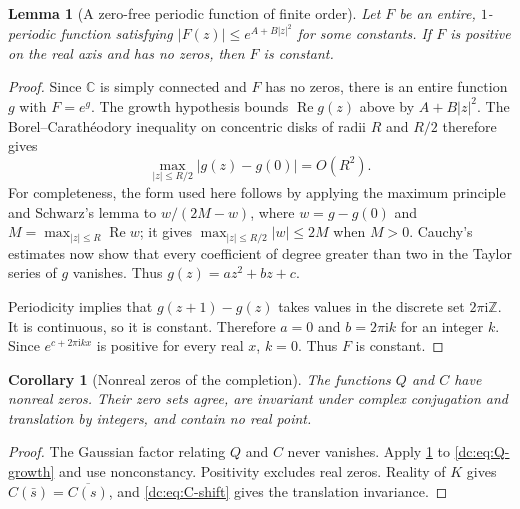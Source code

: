 \documentclass[11pt,a4paper,oneside,openany]{book}
\numberwithin{equation}{chapter}
\newtheorem{lemma}[theorem]{Lemma}
\newtheorem{corollary}[theorem]{Corollary}
\theoremstyle{definition}
\theoremstyle{remark}
\newcommand{\Z}{\mathbb Z}
\newcommand{\C}{\mathbb C}
\newcommand{\ii}{\mathrm i}
\newcommand{\abs}[1]{\left\lvert #1\right\rvert}
\DeclareMathOperator{\Rea}{Re}
\begin{document}
\begin{lemma}[A zero-free periodic function of finite order]
\label{dc:lem:periodic-zero}
Let $F$ be an entire, $1$-periodic function satisfying
$\abs{F(z)}\le e^{A+B\abs z^2}$ for some constants. If $F$ is
positive on the real axis and has no zeros, then $F$ is constant.
\end{lemma}
\begin{proof}
Since $\C$ is simply connected and $F$ has no zeros, there is an
entire function $g$ with $F=e^g$. The growth hypothesis bounds
$\Rea g(z)$ above by $A+B\abs z^2$. The Borel--Carath\'eodory
inequality on concentric disks of radii $R$ and $R/2$ therefore gives
\[
 \max_{\abs z\le R/2}\abs{g(z)-g(0)}=O(R^2).
\]
For completeness, the form used here follows by applying the maximum
principle and Schwarz's lemma to
$w/(2M-w)$, where $w=g-g(0)$ and
$M=\max_{\abs z\le R}\Rea w$; it gives
$\max_{\abs z\le R/2}\abs w\le2M$ when $M>0$.
Cauchy's estimates now show that every coefficient of degree greater
than two in the Taylor series of $g$ vanishes. Thus
$g(z)=az^2+bz+c$.

Periodicity implies that $g(z+1)-g(z)$ takes values in the discrete
set $2\pi\ii\Z$. It is continuous, so it is constant. Therefore
$a=0$ and $b=2\pi\ii k$ for an integer $k$. Since
$e^{c+2\pi\ii kx}$ is positive for every real $x$, $k=0$.
Thus $F$ is constant.
\end{proof}

\begin{corollary}[Nonreal zeros of the completion]
\label{dc:cor:C-zeros}
The functions $Q$ and $C$ have nonreal zeros. Their zero sets agree,
are invariant under complex conjugation and translation by integers,
and contain no real point.
\end{corollary}
\begin{proof}
The Gaussian factor relating $Q$ and $C$ never vanishes. Apply
\cref{dc:lem:periodic-zero} to \cref{dc:eq:Q-growth} and use nonconstancy.
Positivity excludes real zeros. Reality of $K$ gives
$C(\bar s)=\overline{C(s)}$, and \cref{dc:eq:C-shift} gives the
translation invariance.
\end{proof}

\end{document}
